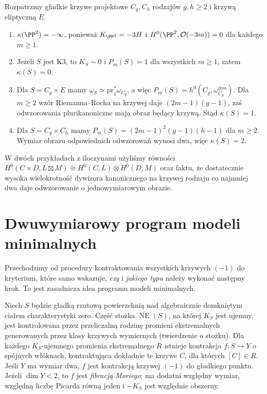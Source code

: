 \begin{przyklad}
\label{prz:ga8-kodaira-four}
Rozpatrzmy gładkie krzywe projektowe $C_g,C_h$
rodzajów $g,h\ge2$ i krzywą eliptyczną $E$.
\begin{enumerate}[label=(\roman*)]
\item $\kappa(\PP^2)=-\infty$, ponieważ
$K_{\PP^2}=-3H$ i $H^0(\PP^2,\mathcal O(-3m))=0$
dla każdego $m\ge1$.
\item Jeżeli $S$ jest K3, to $K_S\sim0$ i
$P_m(S)=1$ dla wszystkich $m\ge1$, zatem $\kappa(S)=0$.
\item Dla $S=C_g\times E$ mamy
$\omega_S\simeq\mathrm{pr}_1^*\omega_{C_g}$,
a więc $P_m(S)=h^0(C_g,\omega_{C_g}^{\otimes m})$.
Dla $m\ge2$ wzór Riemanna--Rocha na krzywej
daje $(2m-1)(g-1)$, zaś odwzorowania
plurikanoniczne mają obraz będący krzywą.
Stąd $\kappa(S)=1$.
\item Dla $S=C_g\times C_h$ mamy
$P_m(S)=(2m-1)^2(g-1)(h-1)$ dla $m\ge2$.
Wymiar obrazu odpowiednich odwzorowań wynosi dwa,
więc $\kappa(S)=2$.
\end{enumerate}
W dwóch przykładach z iloczynami użyliśmy równości
$H^0(C\times D,L\boxtimes M)
\cong H^0(C,L)\otimes H^0(D,M)$ oraz faktu,
że dostatecznie wysoka wielokrotność dywizora
kanonicznego na krzywej rodzaju co najmniej dwa
daje odwzorowanie o jednowymiarowym obrazie.
\end{przyklad}

\section{Dwuwymiarowy program modeli minimalnych}
\label{sec:ga8-surface-mmp}

Przechodzimy od procedury kontraktowania wszystkich
krzywych $(-1)$ do kryterium, które samo wskazuje,
\emph{czy} i \emph{jakiego typu} należy wykonać następny krok.
To jest zasadnicza idea programu modeli minimalnych.

\begin{twierdzenie}
\label{tw:ga8-surface-contraction}
Niech $S$ będzie gładką rzutową powierzchnią nad
algebraicznie domkniętym ciałem charakterystyki zero.
Część stożka $\overline{\operatorname{NE}}(S)$, na której
$K_S$ jest ujemny, jest kontrolowana przez przeliczalną
rodzinę promieni ekstremalnych generowanych przez klasy
krzywych wymiernych (twierdzenie o stożku).
Dla każdego $K_S$-ujemnego promienia ekstremalnego $R$
istnieje kontrakcja $f:S\to Y$ o spójnych włóknach,
kontraktująca dokładnie te krzywe $C$, dla których
$[C]\in R$. Jeśli $Y$ ma wymiar dwa, $f$ jest
kontrakcją krzywej $(-1)$ do gładkiego punktu.
Jeżeli $\dim Y<2$, to $f$ jest \emph{fibracją Moriego}:
ma dodatni względny wymiar, względną liczbę Picarda
równą jeden i $-K_S$ jest względnie obszerny.
\end{twierdzenie}

